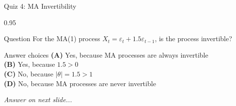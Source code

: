 \documentclass[9pt, aspectratio=169, t]{beamer}
\begin{document}
\begin{frame}{Quiz 4: MA Invertibility}
    \begin{cminipage}{0.95\textwidth}
    \begin{alertblock}{Question}
        For the MA(1) process $X_t = \varepsilon_t + 1.5\varepsilon_{t-1}$, is the process invertible?
    \end{alertblock}

    \vspace{0.4cm}

    \begin{block}{Answer choices}
        \textcolor{MainBlue}{\textbf{(A)}} Yes, because MA processes are always invertible\\[3pt]
        \textcolor{MainBlue}{\textbf{(B)}} Yes, because $1.5 > 0$\\[3pt]
        \textcolor{MainBlue}{\textbf{(C)}} No, because $|\theta| = 1.5 > 1$\\[3pt]
        \textcolor{MainBlue}{\textbf{(D)}} No, because MA processes are never invertible
    \end{block}

    \vspace{0.5cm}

    \begin{center}
        \textit{Answer on next slide...}
    \end{center}
    \end{cminipage}
\end{frame}
\end{document}
